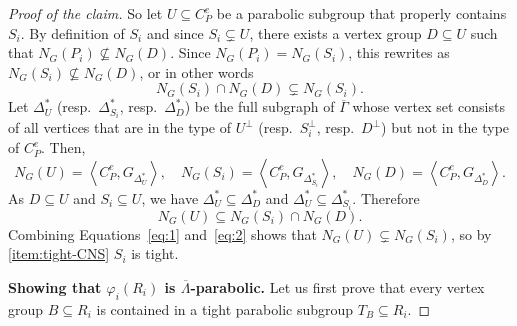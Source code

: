 \documentclass[10pt,a4paper]{amsart}
\begin{document}
\begin{proof}[Proof of the claim]
So let $U\subseteq C_P^e$ be a parabolic subgroup that properly contains $S_i$. By definition of $S_i$ and since $S_i \subsetneq U$, there exists a vertex group $D\subseteq U$ such that $N_G(P_i)\not\subseteq N_G(D)$. Since $N_G(P_i)=N_G(S_i)$, this rewrites as $N_G(S_i)\not\subseteq N_G(D)$, or in other words 
\begin{equation}\label{eq:1}
    N_G(S_i)\cap N_G(D)\subsetneq N_G(S_i).
\end{equation}
Let $\Delta^*_U$ (resp.\ $\Delta^*_{S_i}$, resp.\ $\Delta^*_D$) be the full subgraph of $\overline{\Gamma}$ whose vertex set consists of all vertices that are in the type of $U^\perp$ (resp.\ $S_i^\perp$, resp.\ $D^\perp$) but not in the type of $C_P^e$. Then,
\begin{equation*}
    N_G(U)=\left\langle{C_P^e, G_{\Delta_U^*}} \right\rangle, \quad 
    N_G(S_i)=\left\langle{C_P^e, G_{\Delta_{S_i}^*}} \right\rangle, \quad 
    N_G(D)=\left\langle{C_P^e, G_{\Delta_D^*}} \right\rangle.
\end{equation*} 
As $D\subseteq U$ and $S_i\subseteq U$, we have $\Delta_U^*\subseteq \Delta_D^*$ and $\Delta_U^*\subseteq \Delta_{S_i}^*$. Therefore 
\begin{equation}\label{eq:2}
    N_G(U)\subseteq N_G(S_i)\cap N_G(D).
\end{equation}
Combining Equations~\eqref{eq:1} and~\eqref{eq:2} shows that $N_G(U)\subsetneq N_G(S_i)$, so by \ref{item:tight-CNS} $S_i$ is tight.

\medskip

\textbf{Showing that $\varphi_i(R_i)$ is $\overline{\Lambda}$-parabolic.}
Let us first prove that every vertex group $B\subseteq R_i$ is contained in a tight parabolic subgroup $T_B\subseteq R_i$.


\end{proof}
\end{document}
